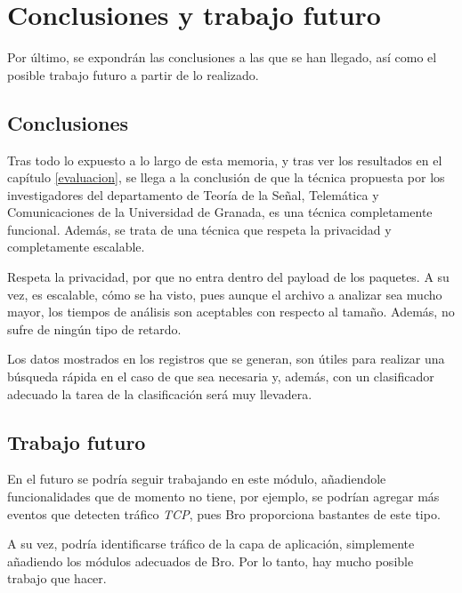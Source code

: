 \chapter{Conclusiones y trabajo futuro}\label{conclusiones}

Por último, se expondrán las conclusiones a las que se han llegado, así como el posible trabajo futuro a partir de lo realizado.

\section{Conclusiones}

Tras todo lo expuesto a lo largo de esta memoria, y tras ver los resultados en el capítulo \ref{evaluacion}, se llega a la conclusión de 
que la técnica propuesta por los investigadores del departamento de Teoría de la Señal, Telemática y Comunicaciones de la Universidad de 
Granada, es una técnica completamente funcional. Además, se trata de una técnica que respeta la privacidad y completamente escalable.

\intro Respeta la privacidad, por que no entra dentro del payload de los paquetes. A su vez, es escalable, cómo se ha visto, pues aunque 
el archivo a analizar sea mucho mayor, los tiempos de análisis son aceptables con respecto al tamaño. Además, no sufre de ningún tipo de 
retardo.

\intro Los datos mostrados en los registros que se generan, son útiles para realizar una búsqueda rápida en el caso de que sea necesaria 
y, además, con un clasificador adecuado la tarea de la clasificación será muy llevadera.


\section{Trabajo futuro}

En el futuro se podría seguir trabajando en este módulo, añadiendole funcionalidades que de momento no tiene, por ejemplo, se podrían 
agregar más eventos que detecten tráfico \textit{TCP}, pues Bro proporciona bastantes de este tipo. 

\intro A su vez, podría identificarse tráfico de la capa de aplicación, simplemente añadiendo los módulos adecuados de Bro. Por lo tanto, hay mucho posible trabajo que hacer.
